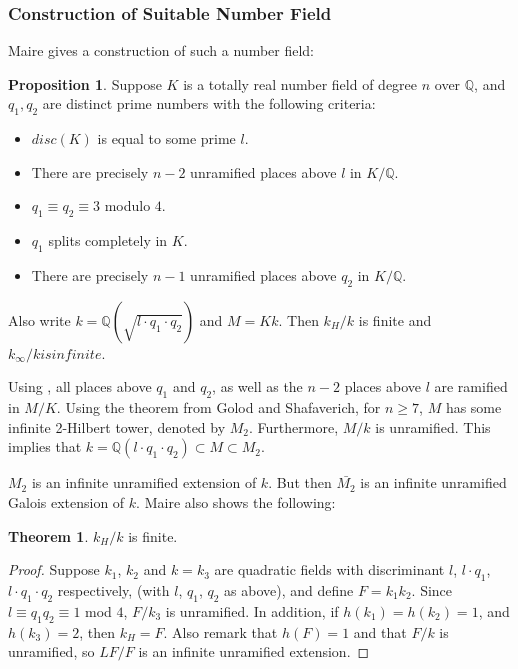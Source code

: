 \documentclass[12pt]{extarticle}
\newcommand{\Q}{\mathbb{Q}}
\newcommand{\<}{\langle}
\renewcommand{\>}{\rangle}
\theoremstyle{definition}
\newtheorem{theorem}{Theorem}
\newtheorem{proposition}{Proposition}
\begin{document}
\subsubsection*{Construction of Suitable Number Field}
Maire gives a construction of such a number field:
\begin{proposition}
\label{prop:maire}
Suppose $K$ is a totally real number field of degree $n$ over $\Q$, and $q_1,q_2$ are distinct prime numbers with the following criteria:
\begin{itemize}

\item $disc(K)$ is equal to some prime $l$.
\item There are precisely $n-2$ unramified places above $l$ in $K/\Q$. 
\item $q_1 \equiv q_2 \equiv 3 $ modulo $4$.
\item $q_1$ splits completely in $K$.
\item There are precisely $n-1$ unramified places above $q_2$ in $K/\Q$. 
\end{itemize}

Also write $k=\Q(\sqrt{l \cdot q_1 \cdot q_2})$ and $M=Kk$. 
Then $k_H/k$ is finite and $k_\infty/k is infinite$.
\end{proposition}


Using , all places above $q_1$ and $q_2$, as well as the $n-2$ places above $l$ are ramified in $M/K$. Using the theorem from Golod and Shafaverich, for $n \geq 7$, $M$ has some infinite 2-Hilbert tower, denoted by $M_2$. Furthermore, $M/k$ is unramified. This implies that 
$k = \Q(l \cdot q_1 \cdot q_2) \subset M \subset M_2$.\par
$M_2$ is an infinite unramified extension of $k$. But then $\bar{M_2}$ is an infinite unramified Galois extension of $k$. Maire also shows the following:
\begin{theorem}
$k_H/k$ is finite.
\end{theorem}
\begin{proof}
Suppose $k_1$, $k_2$ and $k=k_3$ are quadratic fields with discriminant $l$, $l \cdot q_1$, $l \cdot q_1 \cdot q_2$ respectively, (with $l$, $q_1$, $q_2$ as above), and define $F = k_1 k_2$. Since $l \equiv q_1q_2 \equiv 1$ mod $4$, $F/k_3$ is unramified. In addition, if $h(k_1) = h(k_2) =1$, and $h(k_3) = 2$, then $k_H = F$. Also remark that $h(F)=1$ and that $F/k$ is unramified, so $LF/F$ is an infinite unramified extension.
\end{proof}
\end{document}
